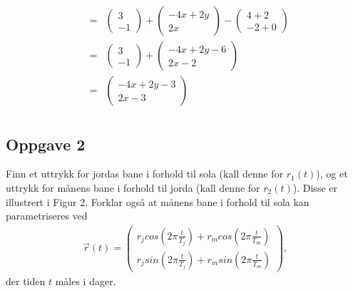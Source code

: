 \documentclass{../../myassignment}
\begin{document}
\begin{answer}
\begin{eqnarray*}
										&=& \begin{pmatrix} 3 \\ -1 \end{pmatrix} + \begin{pmatrix} -4x+2y \\ 2x \end{pmatrix} - \begin{pmatrix} 4+2 \\ -2+0 \end{pmatrix}\\
										&=& \begin{pmatrix} 3 \\ -1 \end{pmatrix} + \begin{pmatrix} -4x+2y-6\\ 2x-2 \end{pmatrix}\\
										&=& \begin{pmatrix} -4x+2y-3\\ 2x-3 \end{pmatrix}\\
			\end{eqnarray*}
		\end{answer}

	\newpage

	\subsection*{Oppgave 2}

	\begin{problem}
		Finn et uttrykk for jordas bane i forhold til sola (kall denne for $r_1(t)$), og et uttrykk for månens bane i forhold til jorda (kall denne for $r_2(t)$). Disse er illustrert i Figur 2. Forklar også at månens bane i forhold til sola kan parametriseres ved 
			\begin{eqnarray*}
				\vec{r}(t) = \begin{pmatrix}
					r_j cos(2\pi \frac{t}{T_j}) + r_m cos(2\pi \frac{t}{T_m}) \\
					r_j sin(2\pi \frac{t}{T_j}) + r_m sin(2\pi\frac{t}{T_m})
				\end{pmatrix},
			\end{eqnarray*}
				der tiden $t$ måles i dager.
	\end{problem}
\end{document}
